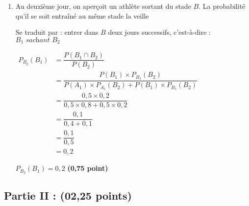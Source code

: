 \documentclass[12pt,a4paper]{article}
\begin{document}
\begin{enumerate}
		\item Au deuxième jour, on aperçoit un athlète sortant du stade \( B \). La probabilité qu’il se soit entraîné au même stade la veille

Se traduit par : entrer dans \( B \) deux jours successifs, c’est-à-dire : \( B_1 \textit{ sachant } B_2 \)

\(
\begin{aligned}
P_{B_2}(B_1) &= \dfrac{P(B_1 \cap B_2)}{P(B_2)} \\
            &= \dfrac{P(B_1) \times P_{B_1}(B_2)}{P(A_1) \times P_{A_1}(B_2) + P(B_1) \times P_{B_1}(B_2)} \\
            &= \dfrac{0,5 \times 0,2}{0,5 \times 0,8 + 0,5 \times 0,2} \\
            &= \dfrac{0,1}{0,4 + 0,1} \\
            &= \dfrac{0,1}{0,5} \\
            &= 0,2
\end{aligned}
\)

\begin{center}
\(\boxed{P_{B_2}(B_1) = 0,2}\) \hfill \textbf{(0,75 point)}
\end{center}



\end{enumerate}

\subsection*{Partie II :  (02,25 points)}
\end{document}
